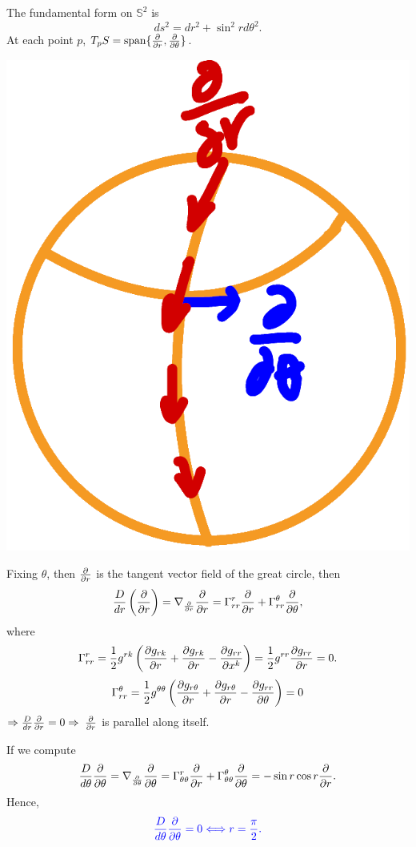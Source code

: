 \begin{remark}
    The  fundamental form on \(\mathbb{S}^2\) is
    \[
        ds^2=dr^2+\sin^2r d \theta^2    .
    \]
    At each point \(p\), \(T_p S=\operatorname{span}\{\pdv{r},\pdv{\theta}\}\).
    \begin{center}
        \includegraphics[scale=.2]{picture/week11/coordinate on S2.png}
    \end{center}
    Fixing \(\theta\), then \(\pdv{r}\) is the tangent vector field
    of the great circle, then 
    \[
        \frac{D}{dr}\left(\pdv{r}\right)=\nabla_{\pdv{r}}\pdv{r}
        =\Gamma\indices*{_{rr}^r}\pdv{r}+\Gamma\indices*{_{rr}^\theta}
        \pdv{\theta},
    \]
    where
    \[
        \Gamma\indices*{_{rr}^r}=\frac{1}{2}g^{rk}\left(
            \pdv{g_{rk}}{r}+\pdv{g_{rk}}{r}-\pdv{g_{rr}}{x^k}
        \right)
        =\frac{1}{2}g^{rr}\pdv{g_{rr}}{r}=0.
    \]
    \[
        \Gamma\indices*{_{rr}^\theta}=\frac{1}{2}
        g^{\theta\theta}\left(
            \pdv{g_{r\theta}}{r}
            +\pdv{g_{r\theta}}{r}
            -\pdv{g_{rr}}{\theta}
        \right)
        =0    
    \]
    \(\Rightarrow\frac{D}{dr}\pdv{r}=0\Rightarrow\) \(\pdv{r}\)
    is parallel along itself.

    If we compute 
    \[
        \frac{D}{d\theta}\pdv{\theta}=\nabla_{\pdv{\theta}}\pdv{\theta}
        =\Gamma\indices*{_{\theta\theta}^r}\pdv{r}+\Gamma
        \indices*{_{\theta\theta}^\theta}\pdv{\theta}
        =-\sin r\cos r \pdv{r}.    
    \]
    Hence, 
    \[
        \textcolor{blue}{
            \frac{D}{d\theta}\pdv{\theta}=0
            \Longleftrightarrow r=\frac{\pi}{2}.}
    \]
\end{remark}
